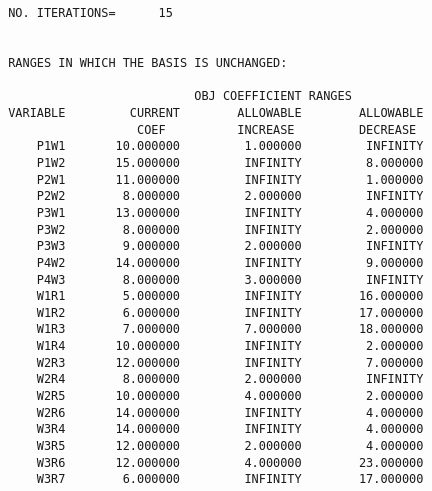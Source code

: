 \documentclass[12pt]{report}
\begin{document}
\begin{verbatim}
 NO. ITERATIONS=      15


 RANGES IN WHICH THE BASIS IS UNCHANGED:

                           OBJ COEFFICIENT RANGES
 VARIABLE         CURRENT        ALLOWABLE        ALLOWABLE
                   COEF          INCREASE         DECREASE
     P1W1       10.000000         1.000000         INFINITY
     P1W2       15.000000         INFINITY         8.000000
     P2W1       11.000000         INFINITY         1.000000
     P2W2        8.000000         2.000000         INFINITY
     P3W1       13.000000         INFINITY         4.000000
     P3W2        8.000000         INFINITY         2.000000
     P3W3        9.000000         2.000000         INFINITY
     P4W2       14.000000         INFINITY         9.000000
     P4W3        8.000000         3.000000         INFINITY
     W1R1        5.000000         INFINITY        16.000000
     W1R2        6.000000         INFINITY        17.000000
     W1R3        7.000000         7.000000        18.000000
     W1R4       10.000000         INFINITY         2.000000
     W2R3       12.000000         INFINITY         7.000000
     W2R4        8.000000         2.000000         INFINITY
     W2R5       10.000000         4.000000         2.000000
     W2R6       14.000000         INFINITY         4.000000
     W3R4       14.000000         INFINITY         4.000000
     W3R5       12.000000         2.000000         4.000000
     W3R6       12.000000         4.000000        23.000000
     W3R7        6.000000         INFINITY        17.000000


\end{verbatim}
\end{document}
